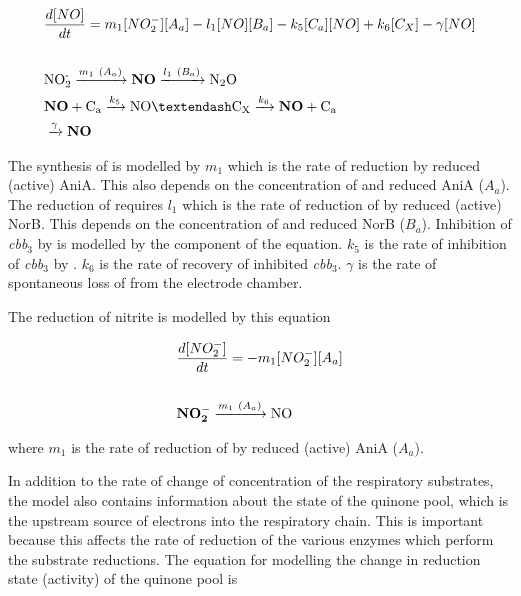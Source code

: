 \begin{eqnarray}
&\frac{d[NO]}{dt} = m_{1}[NO_2^-][A_a] - l_1[NO][B_a] - k_5[C_a][NO] + k_6 [C_X] - \gamma[NO] \nonumber \\\nonumber \\
&\textnormal{NO$_\textnormal{2}^\textnormal{-}$} \xrightarrow{m_1~(A_a)} \bold{NO} \xrightarrow{l_1~(B_a)} \textnormal{N$_\textnormal{2}$O} \nonumber \\
&\bold{NO} + \textnormal{C$_\textnormal{a}$} \xrightarrow{k_5} \textnormal{NO}\textendash \textnormal{C$_\textnormal{X}$} \xrightarrow{k_6} \bold{NO} + \textnormal{C$_\textnormal{a}$} \nonumber \\
&\xrightarrow{\gamma} \bold{NO}
\label{eq:no}
\end{eqnarray}

The synthesis of \cNO \space is modelled by $m_{1}$ which is the rate of \cNitrite \space reduction by reduced (active) AniA. This also depends on the concentration of \cNitrite \space and reduced AniA ($A_a$). The reduction of \cNO \space requires $l_1$ which is the rate of reduction of \cNO \space by reduced (active) NorB. This depends on the concentration of \cNO \space and reduced NorB ($B_a$). Inhibition of \textit{cbb$_{\textrm{3}}$} by \cNO \space is modelled by the  component of the equation. $k_5$ is the rate of inhibition of \textit{cbb$_{\textrm{3}}$} by \cNO. $k_6$ is the rate of recovery of inhibited \textit{cbb$_{\textrm{3}}$}. $\gamma$ is the rate of spontaneous loss of \cNO \space from the electrode chamber.

The reduction of nitrite is modelled by this equation

\begin{eqnarray}
&\frac{d[NO_2^-]}{dt} = - m_{1}[NO_2^-][A_a] \nonumber \\\nonumber \\
&\bold{NO_2^-} \xrightarrow{m_1~(A_a)} \textnormal{NO}
\label{eq:nitrite}
\end{eqnarray}

where $m_{1}$ is the rate of reduction of \cNitrite by reduced (active) AniA ($A_a$).

In addition to the rate of change of concentration of the respiratory substrates, the model also contains information about the state of the quinone pool, which is the upstream source of electrons into the respiratory chain. This is important because this affects the rate of reduction of the various enzymes which perform the substrate reductions. The equation for modelling the change in reduction state (activity) of the quinone pool is

